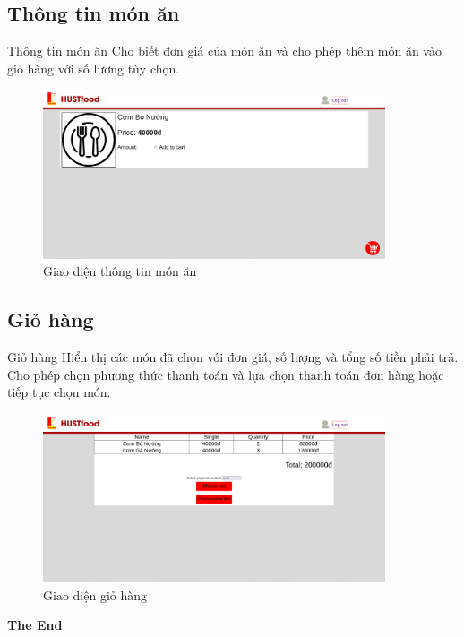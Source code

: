 \documentclass[aspectratio=43,xcolor=dvipsnames]{beamer}
\begin{document}
	\subsection{Thông tin món ăn}
	\begin{frame}{Thông tin món ăn}
	Cho biết đơn giá của món ăn và cho phép thêm món ăn vào giỏ hàng với số lượng tùy chọn.
		\begin{figure}[ht!]
			\centerline{\includegraphics[width=0.9\textwidth]{web-image/Item.png}}
			\caption{Giao diện thông tin món ăn}
			\label{fig:ass1}
		\end{figure}
	\end{frame}
	\subsection{Giỏ hàng}
	\begin{frame}{Giỏ hàng}
	Hiển thị các món đã chọn với đơn giá, số lượng và tổng số tiền phải trả. Cho phép chọn phương thức thanh toán và lựa chọn thanh toán đơn hàng hoặc tiếp tục chọn món.
		\begin{figure}[ht!]
			\centerline{\includegraphics[width=0.9\textwidth]{web-image/giohang.png}}
			\caption{Giao diện giỏ hàng}
			\label{fig:ass1}
		\end{figure}
	\end{frame}
	\begin{frame}
		\Huge{\centerline{\textbf{The End}}}
	\end{frame}
\end{document}
